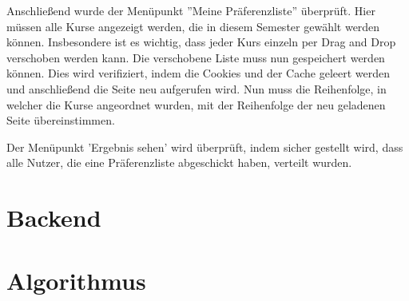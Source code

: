 		Anschließend wurde der Menüpunkt ''Meine Präferenzliste'' überprüft.
		Hier müssen alle Kurse angezeigt werden, die in diesem Semester gewählt werden können.
		Insbesondere ist es wichtig, dass jeder Kurs einzeln per Drag and Drop verschoben werden kann.
		Die verschobene Liste muss nun gespeichert werden können.
		Dies wird verifiziert, indem die Cookies und der Cache geleert werden und anschließend die Seite neu aufgerufen wird.
		Nun muss die Reihenfolge, in welcher die Kurse angeordnet wurden, mit der Reihenfolge der neu geladenen Seite übereinstimmen.\newline
		
		Der Menüpunkt 'Ergebnis sehen' wird überprüft, indem sicher gestellt wird, dass alle Nutzer, die eine Präferenzliste abgeschickt haben, verteilt wurden.\newline
		
	\section{Backend}
	
	\section{Algorithmus}
	
